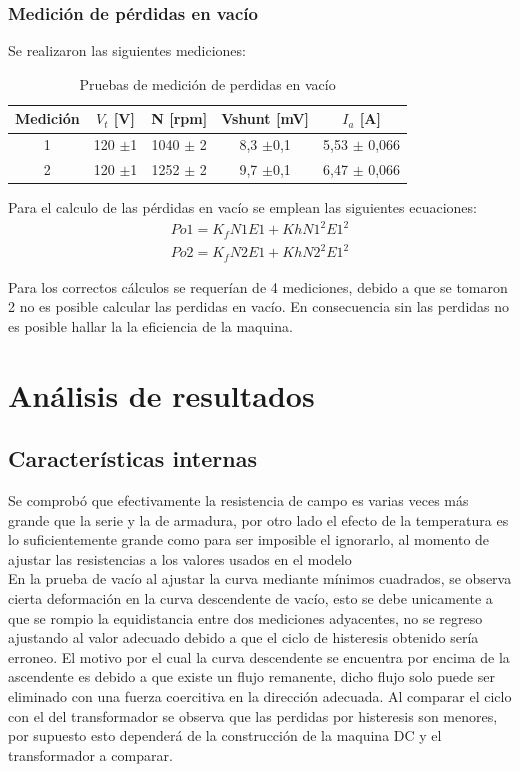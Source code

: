 \documentclass[11pt,letterpaper]{article}     %
\begin{document}
\subsubsection{Medición de pérdidas en vacío}
Se realizaron las siguientes mediciones:
\begin{table}[H]
	\centering
	\caption{Pruebas de medición de perdidas en vacío}
	\begin{tabular}{|c|c|c|c|c|}
		\hline
	Medición	& $V_t$ [V] & N [rpm] & Vshunt [mV] & $I_a$ [A] \\ \hline
	1 & 120 $\pm$1& 1040 $\pm$ 2 & 8,3 $\pm$0,1 & 5,53 $\pm$ 0,066 \\ \hline 
	2 & 120 $\pm$1& 1252 $\pm$ 2 & 9,7 $\pm$0,1 & 6,47 $\pm$ 0,066\\ \hline
	\end{tabular}
\end{table}
Para el calculo de las pérdidas en vacío se emplean las siguientes ecuaciones:
\begin{eqnarray}
Po1 = K_f N1 E1  + Kh N1^2E1^2\\
Po2 = K_f N2 E1  + Kh N2^2E1^2
\end{eqnarray}

Para los correctos cálculos se requerían de 4 mediciones, debido a que se tomaron 2 no es posible calcular las perdidas en vacío. En consecuencia sin las perdidas no es posible hallar la la eficiencia de la maquina.


\section{Análisis de resultados}
\subsection{Características internas}
Se comprobó que efectivamente la resistencia de campo es varias veces más grande que la serie y la de armadura, por otro lado el efecto de la temperatura es lo suficientemente grande como para ser imposible el ignorarlo, al momento de ajustar las resistencias a los valores usados en el modelo\\

En la prueba de vacío al ajustar la curva mediante mínimos cuadrados, se observa cierta deformación en la curva descendente de vacío, esto se debe unicamente a que se rompio la equidistancia entre dos mediciones adyacentes, no se regreso ajustando al valor adecuado debido a que el ciclo de histeresis obtenido sería erroneo. El motivo por el cual la curva descendente se encuentra por encima de la ascendente es debido a que existe un flujo remanente, dicho flujo solo puede ser eliminado con una fuerza coercitiva en la dirección adecuada. Al comparar el ciclo con el del transformador se observa que las perdidas por histeresis son menores, por supuesto esto dependerá de la construcción de la maquina DC y el transformador a comparar.
\end{document}
